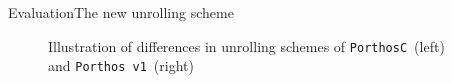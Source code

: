 \documentclass[aspectratio=149]{beamer}
\newcommand{\tool}[1]{\texttt{#1}}
\begin{document}
\begin{frame}{Evaluation}{The new unrolling scheme}
\begin{minipage}{.23\linewidth}
\hfill
\end{minipage}
%
\noindent\begin{minipage}{.75\linewidth}
\begin{figure}
  \vspace{-20pt}
  \centering
\caption{Illustration of differences in unrolling schemes of \tool{PorthosC}~(left) and \tool{Porthos\,v1}~(right)}
\end{figure}
\end{minipage}
\end{frame}
\end{document}

